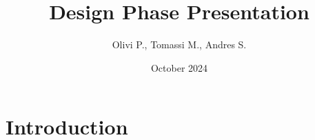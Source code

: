 \documentclass{article}
\title{Design Phase Presentation}
\author{Olivi P., Tomassi M., Andres S.}
\date{October 2024}
\begin{document}
\maketitle

\section{Introduction}
\end{document}
